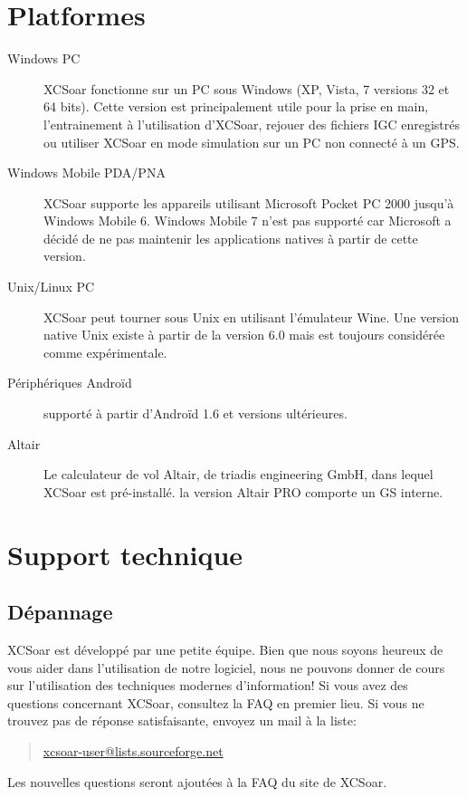 \section{Platformes}
\begin{description}
\item[Windows PC]
XCSoar fonctionne sur un PC sous Windows (XP, Vista, 7 versions 32 et 64 bits). Cette version est principalement utile pour la prise en main, l'entrainement à l'utilisation d'XCSoar, rejouer des fichiers IGC enregistrés ou utiliser XCSoar en mode simulation sur un PC non connecté à un GPS.
\item[Windows Mobile PDA/PNA]
XCSoar supporte les appareils utilisant Microsoft Pocket PC 2000 jusqu'à Windows Mobile 6. Windows Mobile 7 n'est pas supporté car Microsoft a décidé de ne pas maintenir les applications natives à partir de cette version.  
\item[Unix/Linux PC]
XCSoar peut tourner sous Unix en utilisant l'émulateur Wine. Une version native Unix existe à partir de la version 6.0 mais est toujours considérée comme expérimentale.     
\item[Périphériques Androïd] supporté à partir d'Androïd 1.6 et versions ultérieures.
\item[Altair] Le calculateur de vol Altair, de triadis engineering GmbH, dans lequel XCSoar est pré-installé. la version Altair PRO comporte un GS interne. 
\end{description}



\section{Support technique}

\subsection*{Dépannage}
XCSoar est développé par une petite équipe. Bien que nous soyons heureux de vous aider dans l'utilisation de notre logiciel, nous ne pouvons donner de cours sur l'utilisation des techniques modernes d'information!
Si vous avez des questions concernant XCSoar, consultez la FAQ en premier lieu. Si vous ne trouvez pas de réponse satisfaisante, envoyez un mail à la liste:
\begin{quote}
\href{mailto:xcsoar-user@lists.sourceforge.net}{xcsoar-user@lists.sourceforge.net}
\end{quote}

Les nouvelles questions seront ajoutées à la FAQ du site de XCSoar. 

